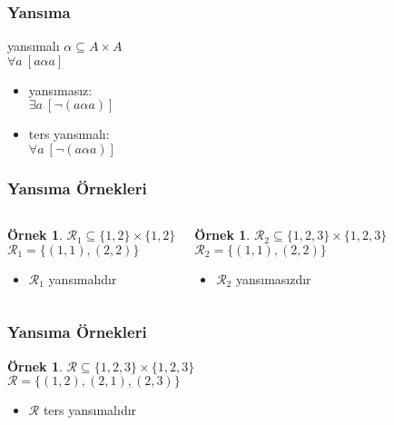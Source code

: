 \documentclass[dvipsnames]{beamer}
\theoremstyle{definition}
\theoremstyle{example}
\newtheorem{ornek}[theorem]{Örnek}
\theoremstyle{plain}
\begin{document}
\begin{frame}
  \frametitle{Yansıma}

  \begin{block}{yansımalı}
    $\alpha \subseteq A \times A$\\
    $\forall a~[a \alpha a]$
  \end{block}

  \pause
  \begin{itemize}
    \item yansımasız:\\
      $\exists a~[\neg (a \alpha a)]$

    \pause
    \item ters yansımalı:\\
      $\forall a~[\neg (a \alpha a)]$
  \end{itemize}
\end{frame}

\begin{frame}
  \frametitle{Yansıma Örnekleri}

  \begin{columns}[t]
    \begin{ornek}
      $\mathcal{R}_1 \subseteq \{1,2\} \times \{1,2\}$\\
      $\mathcal{R}_1 = \{(1,1), (2,2)\}$

      \medskip
      \begin{itemize}
        \item $\mathcal{R}_1$ yansımalıdır
      \end{itemize}
    \end{ornek}

    \pause
    \begin{ornek}
      $\mathcal{R}_2 \subseteq \{1,2,3\} \times \{1,2,3\}$\\
      $\mathcal{R}_2 = \{(1,1), (2,2)\}$

      \medskip
      \begin{itemize}
        \item $\mathcal{R}_2$ yansımasızdır
      \end{itemize}
    \end{ornek}
  \end{columns}
\end{frame}

\begin{frame}
  \frametitle{Yansıma Örnekleri}

  \begin{ornek}
    $\mathcal{R} \subseteq \{1,2,3\} \times \{1,2,3\}$\\
    $\mathcal{R} = \{(1,2), (2,1), (2,3)\}$

    \medskip
    \begin{itemize}
      \item $\mathcal{R}$ ters yansımalıdır
    \end{itemize}
  \end{ornek}
\end{frame}
\end{document}
